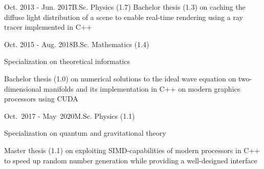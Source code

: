 \documentclass[a4paper,10pt]{cv}
\begin{document}
      \begin{cvTimeItem}{Oct. 2013 - Jun. 2017}{B.Sc. Physics (1.7)}
        Bachelor thesis  (1.3) on caching the diffuse light distribution of a scene to enable real-time rendering using a ray tracer implemented in C++
      \end{cvTimeItem}
      \begin{cvTimeItem}{Oct. 2015 - Aug. 2018}{B.Sc. Mathematics (1.4)}
        \begin{cvItemize}
          \item Specialization on theoretical informatics
          \item Bachelor thesis  (1.0) on numerical solutions to the ideal wave equation on two-dimensional manifolds and its implementation in C++ on modern graphics processors using CUDA
        \end{cvItemize}
      \end{cvTimeItem}
      \begin{cvTimeItem}{Oct.~2017 - May~2020}{M.Sc. Physics (1.1)}
        \begin{cvItemize}
          \item Specialization on quantum and gravitational theory
          \item Master thesis  (1.1) on exploiting SIMD-capabilities of modern processors in C++ to speed up random number generation while providing a well-designed interface
        \end{cvItemize}
      \end{cvTimeItem}
\end{document}
